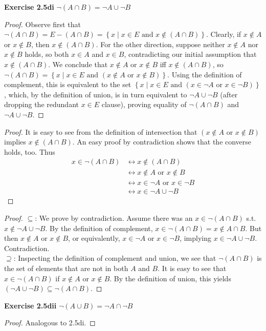 \documentclass[letterpaper,12pt]{article}
\newcommand{\setof}[1]{\ensuremath{\left \{ #1 \right \}}}
\newcommand{\exercise}[1]{\noindent \textbf{Exercise #1} \quad}
\renewcommand{\setminus}{-}
\begin{document}
\exercise{2.5di} $\neg (A \cap B) = \neg A \cup \neg B$
\begin{proof}
	Observe first that $\neg (A \cap B) = E \setminus (A \cap B) = \setof{ x \mid x \in E \text{ and } x \notin (A \cap B)}$. Clearly, if $x \notin A$ or $x \notin B$, then $x \notin (A \cap B)$. For the other direction, suppose neither $x \notin A$ nor $x \notin B$ holds, so both $x \in A$ and $x \in B$, contradicting our initial assumption that $x \notin (A \cap B)$. We conclude that $x \notin A$ or $x \notin B$ iff $x \notin (A \cap B)$, so $\neg (A \cap B) = \setof{x \mid x \in E \text{ and } (x \notin A \text{ or } x \notin B)}$. Using the definition of complement, this is equivalent to the set $\setof{x \mid x \in E \text { and } (x \in \neg A \text{ or } x \in \neg B)}$, which, by the definition of union, is in turn equivalent to $\neg A \cup \neg B$ (after dropping the redundant $x \in E$ clause), proving equality of $\neg (A \cap B)$ and $\neg A \cup \neg B$.
\end{proof}
%
\begin{proof}
	It is easy to see from the definition of intersection that $(x \notin A \text { or } x \notin B)$ implies $x \notin (A \cap B)$. An easy proof by contradiction shows that the converse holds, too. Thus
	\begin{align*}
		x \in \neg (A \cap B)   & \leftrightarrow x \notin (A \cap B) \tag{definition of complement}\\
					& \leftrightarrow x \notin A \text{ or } x \notin B \tag{shown above}\\
					& \leftrightarrow x \in \neg A \text{ or } x \in \neg B \tag{definition of complement}\\
					& \leftrightarrow x \in \neg A \cup \neg B \tag{definition of union}
	\end{align*}
\end{proof}
%
\begin{proof}
	$\subseteq$: We prove by contradiction. Assume there was an $x \in \neg (A \cap B)$ s.t.\ $x \notin \neg A \cup \neg B$. By the definition of complement, $x \in \neg (A \cap B) = x \notin A \cap B$. But then $x \notin A$ or $x \notin B$, or equivalently, $x \in \neg A$ or $x \in \neg B$, implying $x \in \neg A \cup \neg B$. Contradiction.\\
	$\supseteq$: Inspecting the definition of complement and union, we see that $\neg (A \cap B)$ is the set of elements that are not in both $A$ and $B$. It is easy to see that $x \in \neg (A \cap B)$ if $x \notin A$ or $x \notin B$. By the definition of union, this yields $(\neg A \cup \neg B) \subseteq \neg (A \cap B)$.
\end{proof}


\exercise{2.5dii} $\neg (A \cup B) = \neg A \cap \neg B$
\begin{proof}
	Analogous to 2.5di.
\end{proof}
\end{document}
